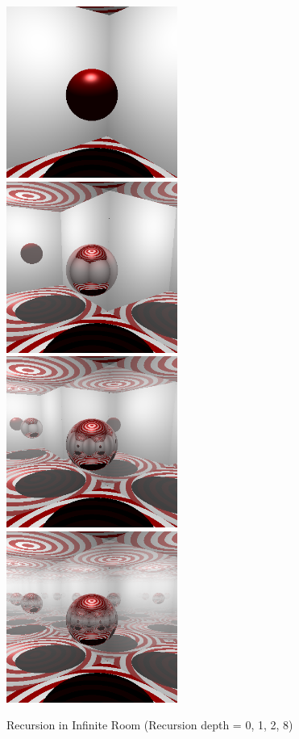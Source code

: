 \documentclass[10pt,a4paper]{report}
\begin{document}
\begin{figure}[h!]
\caption{Recursion in Infinite Room (Recursion depth = 0, 1, 2, 8)}
    \includegraphics[width=0.5\textwidth]{02_Exc_Raytracing_Framework/rec0.png}
    \includegraphics[width=0.5\textwidth]{02_Exc_Raytracing_Framework/rec1.png}
        \includegraphics[width=0.5\textwidth]{02_Exc_Raytracing_Framework/rec2.png}
            \includegraphics[width=0.5\textwidth]{02_Exc_Raytracing_Framework/rec8.png}
\end{figure}
\end{document}
